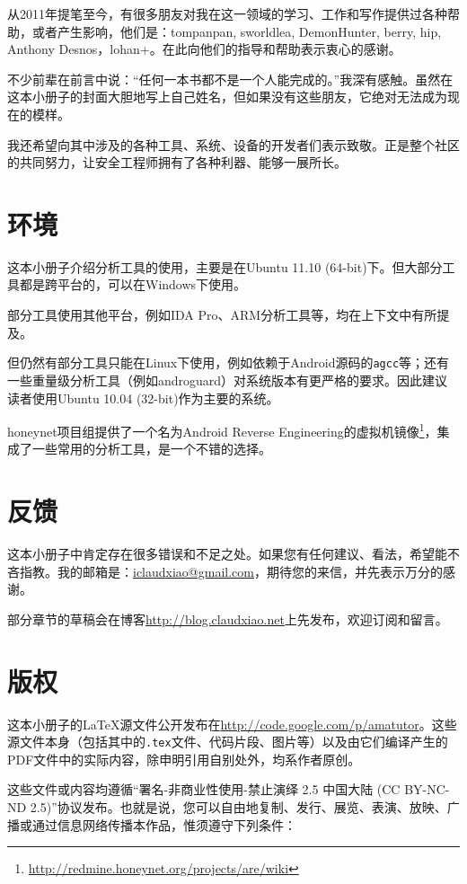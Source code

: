 从2011年提笔至今，有很多朋友对我在这一领域的学习、工作和写作提供过各种帮助，或者产生影响，他们是：tompanpan, sworldlea, DemonHunter, berry, hip, Anthony Desnos，lohan+。在此向他们的指导和帮助表示衷心的感谢。

不少前辈在前言中说：“任何一本书都不是一个人能完成的。”我深有感触。虽然在这本小册子的封面大胆地写上自己姓名，但如果没有这些朋友，它绝对无法成为现在的模样。

我还希望向其中涉及的各种工具、系统、设备的开发者们表示致敬。正是整个社区的共同努力，让安全工程师拥有了各种利器、能够一展所长。

\section*{环境}
这本小册子介绍分析工具的使用，主要是在Ubuntu 11.10 (64-bit)下。但大部分工具都是跨平台的，可以在Windows下使用。

部分工具使用其他平台，例如IDA Pro、ARM分析工具等，均在上下文中有所提及。

但仍然有部分工具只能在Linux下使用，例如依赖于Android源码的\lstinline!agcc!等；还有一些重量级分析工具（例如androguard）对系统版本有更严格的要求。因此建议读者使用Ubuntu 10.04 (32-bit)作为主要的系统。

honeynet项目组提供了一个名为Android Reverse Engineering的虚拟机镜像\footnote{\url{http://redmine.honeynet.org/projects/are/wiki}}，集成了一些常用的分析工具，是一个不错的选择。

\section*{反馈}
这本小册子中肯定存在很多错误和不足之处。如果您有任何建议、看法，希望能不吝指教。我的邮箱是：\href{mailto:iclaudxiao@gmail.com}{iclaudxiao@gmail.com}，期待您的来信，并先表示万分的感谢。

部分章节的草稿会在博客\url{http://blog.claudxiao.net}上先发布，欢迎订阅和留言。

\section*{版权}
这本小册子的{\LaTeX}源文件公开发布在\url{http://code.google.com/p/amatutor}。这些源文件本身（包括其中的\lstinline!.tex!文件、代码片段、图片等）以及由它们编译产生的PDF文件中的实际内容，除申明引用自别处外，均系作者原创。

这些文件或内容均遵循“署名-非商业性使用-禁止演绎 2.5 中国大陆 (CC BY-NC-ND 2.5)”协议发布。也就是说，您可以自由地复制、发行、展览、表演、放映、广播或通过信息网络传播本作品，惟须遵守下列条件：

